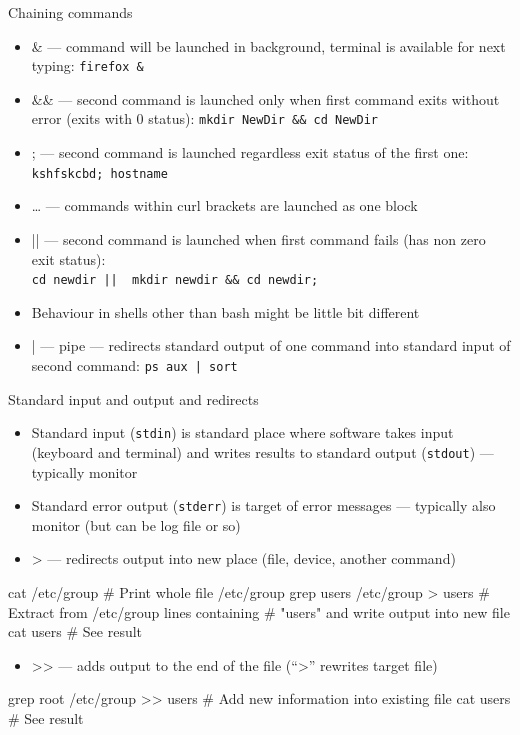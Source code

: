 \documentclass[hyperref={bookmarks=true, unicode=true, colorlinks=true, pdftitle={Linux, command line and MetaCentrum}, plainpages=false, pdfauthor={Vojtech Zeisek}, pdfsubject={Course about use of Linux command line, writing shell scripts and using MetaCentrum of CESNET}, pdfcreator={XeLaTeX, http://www.xelatex.org/}, pdfkeywords={Linux, GNU, BASH, shell, command line, MetaCentrum}, linkcolor=Sienna, anchorcolor=black, citecolor=green, filecolor=magenta, menucolor=Sienna, urlcolor=cyan, pdftex}, compress, ucs, xelatex, xcolor=svgnames, 11pt]{beamer}
\begin{document}
\begin{frame}{Chaining commands}
\begin{itemize}
  \item \alert{\&} --- command will be launched in background, terminal is available for next typing: \texttt{firefox \&}
  \item \alert{\&\&} --- second command is launched only when first command exits without error (exits with 0 status): \texttt{mkdir NewDir \&\& cd NewDir}
  \item \alert{;} --- second command is launched regardless exit status of the first one: \texttt{kshfskcbd; hostname}
  \item \alert{\textbraceleft\ldots\textbraceright} --- commands within curl brackets are launched as one block
  \item \alert{||} --- second command is launched when first command fails (has non zero exit status):\\\texttt{cd newdir || \textbraceleft~mkdir newdir \&\& cd newdir; \textbraceright}
  \item Behaviour in shells other than bash might be little bit different
  \item \alert{|} --- pipe --- redirects standard output of one command into standard input of second command: \texttt{ps aux | sort}
\end{itemize}
\end{frame}

\begin{frame}[fragile]{Standard input and output and redirects}
\begin{itemize}
  \item Standard input (\texttt{stdin}) is standard place where software takes input (keyboard and terminal) and writes results to standard output (\texttt{stdout}) --- typically monitor
  \item Standard error output (\texttt{stderr}) is target of error messages --- typically also monitor (but can be log file or so)
  \item \alert{\textgreater} --- redirects output into new place (file, device, another command)
\end{itemize}
  \begin{bashcode}
    cat /etc/group # Print whole file /etc/group
    grep users /etc/group > users # Extract from /etc/group lines containing
                                  # "users" and write output into new file
    cat users # See result
  \end{bashcode}
\begin{itemize}
  \item \alert{\textgreater\textgreater} --- adds output to the end of the file (``\textgreater'' rewrites target file)
\end{itemize}
  \begin{bashcode}
    grep root /etc/group >> users # Add new information into existing file
    cat users # See result
  \end{bashcode}
\end{frame}
\end{document}
